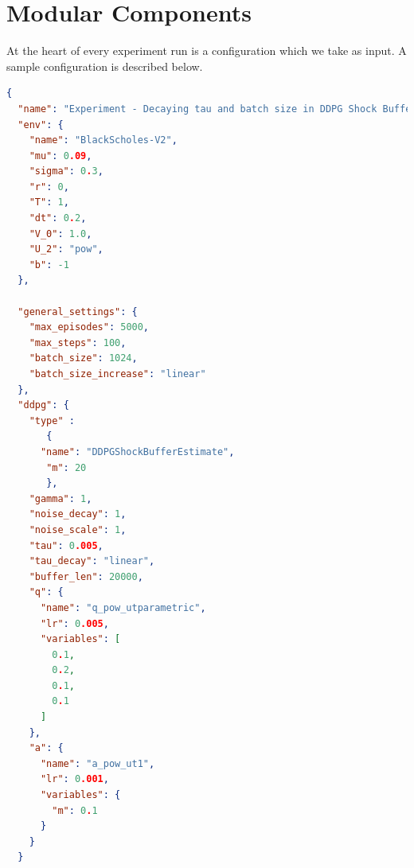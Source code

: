 \section{Modular Components}\label{section:Modular Components}
At the heart of every experiment run is a configuration which we take as input.
A sample configuration is described below.
\begin{lstlisting}[language=json,firstnumber=1,caption=Example Configuration,label=json:sample_config]
{
  "name": "Experiment - Decaying tau and batch size in DDPG Shock Buffer version",
  "env": {
    "name": "BlackScholes-V2",
    "mu": 0.09,
    "sigma": 0.3,
    "r": 0,
    "T": 1,
    "dt": 0.2,
    "V_0": 1.0,
    "U_2": "pow",
    "b": -1
  },

  "general_settings": {
    "max_episodes": 5000,
    "max_steps": 100,
    "batch_size": 1024,
    "batch_size_increase": "linear"
  },
  "ddpg": {
    "type" :
       {
      "name": "DDPGShockBufferEstimate",
       "m": 20
       },
    "gamma": 1,
    "noise_decay": 1,
    "noise_scale": 1,
    "tau": 0.005,
    "tau_decay": "linear",
    "buffer_len": 20000,
    "q": {
      "name": "q_pow_utparametric",
      "lr": 0.005,
      "variables": [
        0.1,
        0.2,
        0.1,
        0.1
      ]
    },
    "a": {
      "name": "a_pow_ut1",
      "lr": 0.001,
      "variables": {
        "m": 0.1
      }
    }
  }

\end{lstlisting}

